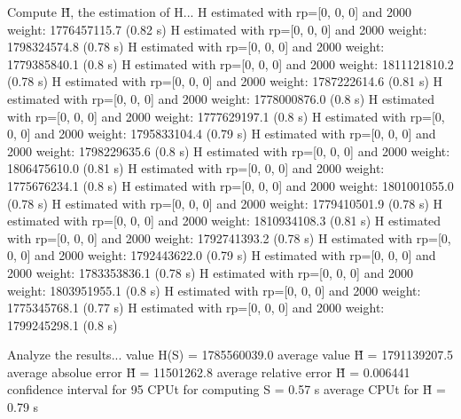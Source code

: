 Compute H̃, the estimation of H...
  H estimated with rp=[0, 0, 0] and 2000 weight:  1776457115.7  (0.82 s)
  H estimated with rp=[0, 0, 0] and 2000 weight:  1798324574.8  (0.78 s)
  H estimated with rp=[0, 0, 0] and 2000 weight:  1779385840.1  (0.8 s)
  H estimated with rp=[0, 0, 0] and 2000 weight:  1811121810.2  (0.78 s)
  H estimated with rp=[0, 0, 0] and 2000 weight:  1787222614.6  (0.81 s)
  H estimated with rp=[0, 0, 0] and 2000 weight:  1778000876.0  (0.8 s)
  H estimated with rp=[0, 0, 0] and 2000 weight:  1777629197.1  (0.8 s)
  H estimated with rp=[0, 0, 0] and 2000 weight:  1795833104.4  (0.79 s)
  H estimated with rp=[0, 0, 0] and 2000 weight:  1798229635.6  (0.8 s)
  H estimated with rp=[0, 0, 0] and 2000 weight:  1806475610.0  (0.81 s)
  H estimated with rp=[0, 0, 0] and 2000 weight:  1775676234.1  (0.8 s)
  H estimated with rp=[0, 0, 0] and 2000 weight:  1801001055.0  (0.78 s)
  H estimated with rp=[0, 0, 0] and 2000 weight:  1779410501.9  (0.78 s)
  H estimated with rp=[0, 0, 0] and 2000 weight:  1810934108.3  (0.81 s)
  H estimated with rp=[0, 0, 0] and 2000 weight:  1792741393.2  (0.78 s)
  H estimated with rp=[0, 0, 0] and 2000 weight:  1792443622.0  (0.79 s)
  H estimated with rp=[0, 0, 0] and 2000 weight:  1783353836.1  (0.78 s)
  H estimated with rp=[0, 0, 0] and 2000 weight:  1803951955.1  (0.8 s)
  H estimated with rp=[0, 0, 0] and 2000 weight:  1775345768.1  (0.77 s)
  H estimated with rp=[0, 0, 0] and 2000 weight:  1799245298.1  (0.8 s)

Analyze the results...
  value H(S)                  = 1785560039.0 
  average value H̃             = 1791139207.5 
  average absolue error H̃     = 11501262.8 
  average relative error H̃    = 0.006441 
  confidence interval for 95%
  CPUt for computing S         = 0.57 s
  average CPUt for H̃           = 0.79 s

